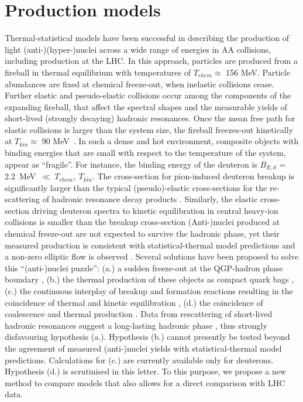 \documentclass{appolb}
\begin{document}
\section{Production models}
Thermal-statistical models have been successful in describing the production of light \mbox{(anti-)}(hyper-)nuclei across a wide range of energies in AA collisions, including production at the LHC.
In this approach, particles are produced from a fireball in thermal equilibrium with temperatures of $T_{chem} \approx$ 156 MeV.
Particle abundances are fixed at chemical freeze-out, when inelastic collisions cease. Further elastic and pseudo-elastic collisions occur among the components of the expanding fireball, that affect the spectral shapes and the measurable yields of short-lived (strongly decaying) hadronic resonances. 
Once the mean free path for elastic collisions is larger than the system size, the fireball freezes-out kinetically at $T_{kin} \approx$ 90 MeV~\cite{Abelev:2013vea}. 
In such a dense and hot environment, composite objects with binding energies that are small with respect to the temperature of the system, appear as ``fragile''. 
For instance, the binding energy of the deuteron is $B_{E, d}$ = 2.2~MeV~$\ll~T_{chem},~T_{kin}$.
The cross-section for pion-induced deuteron breakup is significantly larger than the typical (pseudo)-elastic cross-sections for the re-scattering of hadronic resonance decay products \cite{Garcilazo:1982yc, Bass:1998ca, Schukraft:2017nbn, Oliinychenko:2018ugs}. 
Similarly, the elastic cross-section driving deuteron spectra to kinetic equilibration in central heavy-ion collisions \cite{Acharya:2017dmc} is smaller than the breakup cross-section \cite{Garcilazo:1982yc, Bass:1998ca, Schukraft:2017nbn, Oliinychenko:2018ugs}   
(Anti-)nuclei produced at chemical freeze-out are not expected to survive the hadronic phase, yet their measured production is consistent with statistical-thermal model predictions and a non-zero elliptic flow is observed \cite{Acharya:2017dmc, Puccio:2019oyd}. 
Several solutions have been proposed to solve this ``(anti-)nuclei puzzle'': (a.) a sudden freeze-out at the QGP-hadron phase boundary \cite{Castorina:2019pnb}, (b.) the thermal production of these objects as compact quark bags \cite{Andronic:2017}, (c.) the continuous interplay of breakup and formation reactions resulting in the coincidence of thermal and kinetic equilibration \cite{Oliinychenko:2018ugs, Xu:2018jff}, (d.) the coincidence of coalescence and thermal production \cite{Scheibl:1998tk, HeinzTorino}.
Data from rescattering of short-lived hadronic resonances suggest a long-lasting hadronic phase \cite{Abelev:2014uua}, thus strongly disfavouring hypothesis (a.). 
Hypothesis (b.) cannot presently be tested beyond the agreement of measured (anti-)nuclei yields with statistical-thermal model predictions. Calculations for (c.) are currently available only for deuterons. Hypothesis (d.) is scrutinised in this letter.
To this purpose, we propose a new method to compare models that also allows for a direct comparison with LHC data. 
\end{document}
